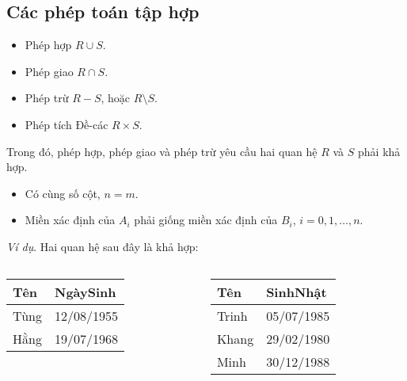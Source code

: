 \documentclass[11pt]{beamer}
\begin{document}
  \subsection{Các phép toán tập hợp}
  \begin{frame}
    \begin{itemize}
      \item<2-> Phép hợp $R \cup S$.
      \item<2-> Phép giao $R \cap S$.
      \item<2-> Phép trừ $R - S$, hoặc $R \setminus S$.
      \item<2-> Phép tích Đề-các $R \times S$.
    \end{itemize}
  \end{frame}
  \begin{frame}
    Trong đó, phép hợp, phép giao và phép trừ yêu cầu hai quan hệ $R$ và $S$ phải khả hợp.
  \end{frame}
  \begin{frame}
    \begin{itemize}
      \item<2-> Có cùng số cột, $n = m$.
      \item<3-> Miền xác định của $A_i$ phải giống miền xác định của $B_i$, $i = 0, 1, \dots, n$.
    \end{itemize}
  \end{frame}
  \begin{frame}
    \textit{Ví dụ}. Hai quan hệ sau đây là khả hợp:
    \begin{center}
      \begin{columns}[T]
        \begin{column}{0.5\textwidth}
          \begin{tabular}{|l|l|}
            \hline
            Tên & NgàySinh \\ \hline
            Tùng & 12/08/1955 \\ \hline
            Hằng & 19/07/1968 \\ \hline        
          \end{tabular}
        \end{column}
        \begin{column}{0.5\textwidth}
          \begin{tabular}{|l|l|}
            \hline
            Tên & SinhNhật \\ \hline
            Trinh & 05/07/1985 \\ \hline
            Khang & 29/02/1980 \\ \hline 
            Minh & 30/12/1988 \\ \hline
          \end{tabular}
        \end{column}
      \end{columns}
    \end{center}
  \end{frame}
\end{document}
